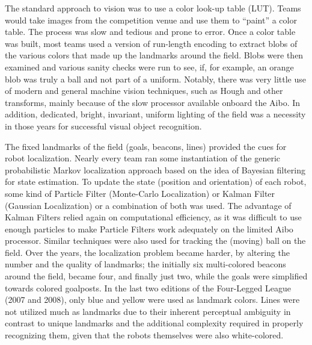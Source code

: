 \documentclass{llncs}
\begin{document}
The standard approach to vision was to use a color look-up table (LUT).
Teams would take images from the competition venue and use them to
``paint'' a color table. The process was slow and tedious and prone to error.
Once a color table was built, most teams used a version of run-length encoding
to extract blobs of the various colors that made up the landmarks around the field.
Blobs were then examined and various sanity checks were run to see, if,
for example, an orange blob was truly a ball and not part of a uniform.
Notably, there was very little use of modern and general machine vision techniques,
such as Hough and other transforms, mainly because of the slow processor
available onboard the Aibo. In addition, dedicated, bright, invariant, uniform lighting of the field was a necessity 
in those years for successful visual object recognition. 

The fixed landmarks of the field (goals, beacons, lines) provided the cues for robot localization. 
Nearly every team ran some instantiation of the generic probabilistic Markov localization approach based on the idea of Bayesian filtering for state estimation. 
To update the state (position and orientation) of each robot, some kind of Particle Filter (Monte-Carlo
Localization) or Kalman Filter (Gaussian Localization) or a combination of both was used. The advantage of Kalman Filters 
relied again on computational efficiency, as it was difficult to use enough
particles to make Particle Filters work adequately on the limited 
Aibo processor. 
Similar techniques were also used for tracking the (moving) ball on the field. 
Over the years, the localization problem became harder, by altering 
the number and the quality of landmarks; the initially six multi-colored beacons 
around the field, became four, and finally just two, while the goals were 
simplified towards colored goalposts. In the last two editions 
of the Four-Legged League (2007 and 2008), only blue and yellow were used as landmark colors. 
Lines were not utilized much as landmarks due to their inherent perceptual ambiguity 
in contrast to unique landmarks and the additional complexity required 
in properly recognizing them, given that the robots themselves were also white-colored. 
\end{document}
